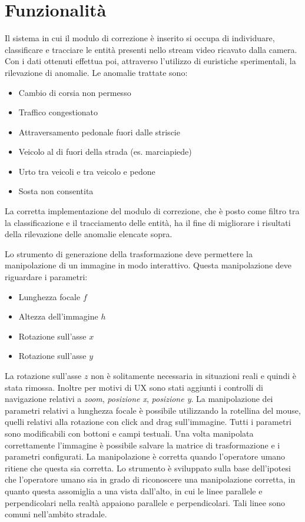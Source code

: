 \chapter{Funzionalità}
\label{sec:funzionalita}


Il sistema in cui il modulo di correzione è inserito si occupa di individuare, classificare e tracciare le entità presenti nello stream video ricavato dalla camera.
Con i dati ottenuti effettua poi, attraverso l'utilizzo di euristiche sperimentali, la rilevazione di anomalie.
Le anomalie trattate sono:
\begin{itemize}
    \item Cambio di corsia non permesso
    \item Traffico congestionato
    \item Attraversamento pedonale fuori dalle striscie 
    \item Veicolo al di fuori della strada (es. marciapiede) %
    \item Urto tra veicoli e tra veicolo e pedone
    \item Sosta non consentita
\end{itemize}
La corretta implementazione del modulo di correzione, che è posto come filtro tra la classificazione e il tracciamento delle entità, ha il fine di migliorare i risultati della rilevazione delle anomalie elencate sopra.

Lo strumento di generazione della trasformazione deve permettere la manipolazione di un immagine in modo interattivo.
Questa manipolazione deve riguardare i parametri:
\begin{itemize}
    \item Lunghezza focale $f$
    \item Altezza dell'immagine $h$
    \item Rotazione sull'asse $x$
    \item Rotazione sull'asse $y$
\end{itemize}
La rotazione sull'asse $z$ non è solitamente necessaria in situazioni reali e quindi è stata rimossa.
Inoltre per motivi di UX sono stati aggiunti i controlli di navigazione relativi a \emph{zoom}, \emph{posizione x}, \emph{posizione y}.
La manipolazione dei parametri relativi a lunghezza focale è possibile utilizzando la rotellina del mouse, quelli relativi alla rotazione con click and drag sull'immagine.
Tutti i parametri sono modificabili con bottoni e campi testuali.
Una volta manipolata correttamente l'immagine è possibile salvare la matrice di trasformazione e i parametri configurati.
La manipolazione è corretta quando l'operatore umano ritiene che questa sia corretta. Lo strumento è sviluppato sulla base dell'ipotesi che l'operatore umano sia in grado di riconoscere una manipolazione corretta, in quanto questa assomiglia a una vista dall'alto, in cui le linee parallele e perpendicolari nella realtà appaiono parallele e perpendicolari. Tali linee sono comuni nell'ambito stradale.

